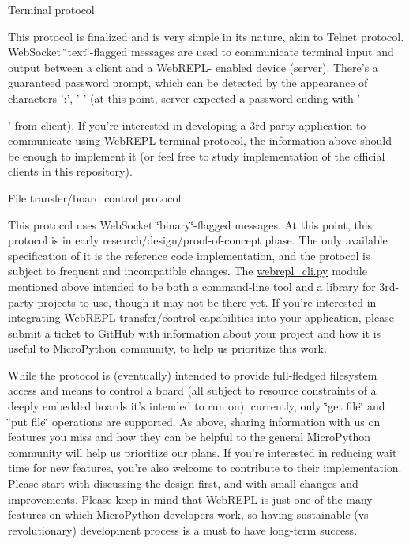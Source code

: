 \begin{DoxyItemize}
\item Terminal protocol
\end{DoxyItemize}

This protocol is finalized and is very simple in its nature, akin to Telnet protocol. Web\-Socket \char`\"{}text\char`\"{}-\/flagged messages are used to communicate terminal input and output between a client and a Web\-R\-E\-P\-L-\/ enabled device (server). There's a guaranteed password prompt, which can be detected by the appearance of characters '\-:', ' ' (at this point, server expected a password ending with '\par
' from client). If you're interested in developing a 3rd-\/party application to communicate using Web\-R\-E\-P\-L terminal protocol, the information above should be enough to implement it (or feel free to study implementation of the official clients in this repository).


\begin{DoxyItemize}
\item File transfer/board control protocol
\end{DoxyItemize}

This protocol uses Web\-Socket \char`\"{}binary\char`\"{}-\/flagged messages. At this point, this protocol is in early research/design/proof-\/of-\/concept phase. The only available specification of it is the reference code implementation, and the protocol is subject to frequent and incompatible changes. The {\ttfamily \hyperlink{webrepl__cli_8py}{webrepl\-\_\-cli.\-py}} module mentioned above intended to be both a command-\/line tool and a library for 3rd-\/party projects to use, though it may not be there yet. If you're interested in integrating Web\-R\-E\-P\-L transfer/control capabilities into your application, please submit a ticket to Git\-Hub with information about your project and how it is useful to Micro\-Python community, to help us prioritize this work.

While the protocol is (eventually) intended to provide full-\/fledged filesystem access and means to control a board (all subject to resource constraints of a deeply embedded boards it's intended to run on), currently, only \char`\"{}get file\char`\"{} and \char`\"{}put file\char`\"{} operations are supported. As above, sharing information with us on features you miss and how they can be helpful to the general Micro\-Python community will help us prioritize our plans. If you're interested in reducing wait time for new features, you're also welcome to contribute to their implementation. Please start with discussing the design first, and with small changes and improvements. Please keep in mind that Web\-R\-E\-P\-L is just one of the many features on which Micro\-Python developers work, so having sustainable (vs revolutionary) development process is a must to have long-\/term success. 